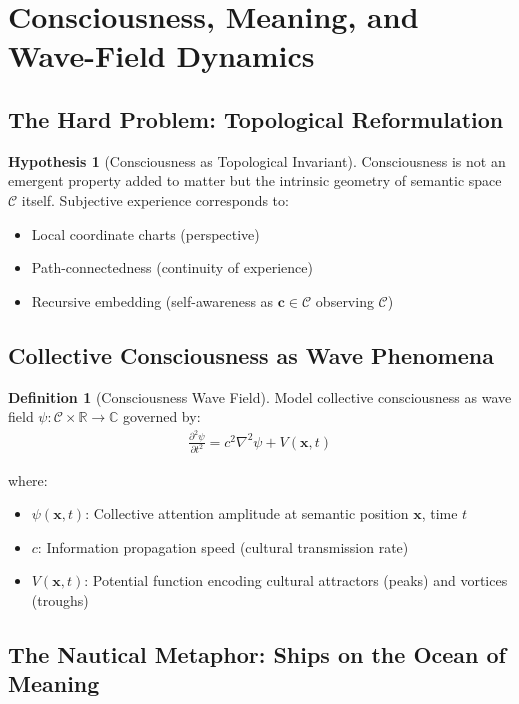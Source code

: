 \documentclass[11pt,a4paper]{article}
\theoremstyle{definition}
\newtheorem{definition}{Definition}[section]
\newtheorem{hypothesis}{Hypothesis}[section]
\theoremstyle{remark}
\newcommand{\RR}{\mathbb{R}}
\newcommand{\CC}{\mathcal{C}}
\newcommand{\cc}{\mathbf{c}}
\begin{document}
\section{Consciousness, Meaning, and Wave-Field Dynamics}

\subsection{The Hard Problem: Topological Reformulation}

\begin{hypothesis}[Consciousness as Topological Invariant]
Consciousness is not an emergent property added to matter but the intrinsic geometry of semantic space \(\CC\) itself. Subjective experience corresponds to:
\begin{itemize}
\item Local coordinate charts (perspective)
\item Path-connectedness (continuity of experience)
\item Recursive embedding (self-awareness as \(\cc \in \CC\) observing \(\CC\))
\end{itemize}
\end{hypothesis}

\subsection{Collective Consciousness as Wave Phenomena}

\begin{definition}[Consciousness Wave Field]
Model collective consciousness as wave field \(\psi: \CC \times \RR \rightarrow \mathbb{C}\) governed by:
\begin{align}
\frac{\partial^2 \psi}{\partial t^2} = c^2 \nabla^2 \psi + V(\mathbf{x}, t)
\end{align}

where:
\begin{itemize}
\item \(\psi(\mathbf{x}, t)\): Collective attention amplitude at semantic position \(\mathbf{x}\), time \(t\)
\item \(c\): Information propagation speed (cultural transmission rate)
\item \(V(\mathbf{x}, t)\): Potential function encoding cultural attractors (peaks) and vortices (troughs)
\end{itemize}
\end{definition}

\subsection{The Nautical Metaphor: Ships on the Ocean of Meaning}
\end{document}
